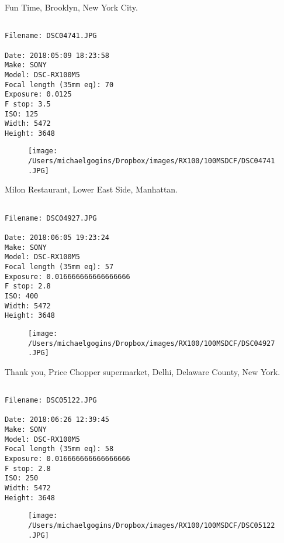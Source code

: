 \clearpage
\onecolumn
\noindent Fun Time, Brooklyn, New York City.
\noindent
\begin{lstlisting}

Filename: DSC04741.JPG

Date: 2018:05:09 18:23:58
Make: SONY
Model: DSC-RX100M5
Focal length (35mm eq): 70
Exposure: 0.0125
F stop: 3.5
ISO: 125
Width: 5472
Height: 3648
\end{lstlisting}
\clearpage

\begin{figure}
\texttt{[image: /Users/michaelgogins/Dropbox/images/RX100/100MSDCF/DSC04741.JPG]}
\end{figure}
    
\clearpage
\onecolumn
\noindent Milon Restaurant, Lower East Side, Manhattan.
\noindent
\begin{lstlisting}

Filename: DSC04927.JPG

Date: 2018:06:05 19:23:24
Make: SONY
Model: DSC-RX100M5
Focal length (35mm eq): 57
Exposure: 0.016666666666666666
F stop: 2.8
ISO: 400
Width: 5472
Height: 3648
\end{lstlisting}
\clearpage

\begin{figure}
\texttt{[image: /Users/michaelgogins/Dropbox/images/RX100/100MSDCF/DSC04927.JPG]}
\end{figure}
    
\clearpage
\onecolumn
\noindent Thank you, Price Chopper supermarket, Delhi, Delaware County, New York.
\noindent
\begin{lstlisting}

Filename: DSC05122.JPG

Date: 2018:06:26 12:39:45
Make: SONY
Model: DSC-RX100M5
Focal length (35mm eq): 58
Exposure: 0.016666666666666666
F stop: 2.8
ISO: 250
Width: 5472
Height: 3648
\end{lstlisting}
\clearpage

\begin{figure}
\texttt{[image: /Users/michaelgogins/Dropbox/images/RX100/100MSDCF/DSC05122.JPG]}
\end{figure}
    
